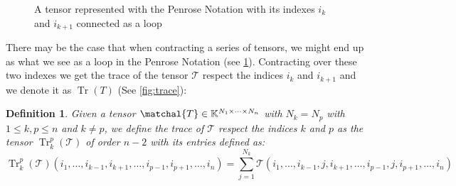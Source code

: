 \documentclass[11pt,a4paper,openright,oneside]{book}
\numberwithin{equation}{section}
\newtheorem{defn0}{Definition}[chapter]
\newenvironment{definition}{ \begin{defn0}}{\end{defn0}}
\newcommand{\figref}[1]{\cref{#1}}
\DeclareMathOperator{\Tr}{Tr}
\begin{document}
\begin{figure}
\centering
{}
\caption{
    A tensor represented with the Penrose Notation with its indexes $i_k$ and $i_{k+1}$ connected as a loop
}
\label{fig:loop}
\end{figure}

There may be the case that when contracting a series of tensors, we might end up as what
we see as a loop in the Penrose Notation (see \figref{fig:loop}). Contracting over these two indexes we get the trace
of the tensor $\mathcal{T}$ respect the indices $i_k$ and $i_{k+1}$ and we denote it as $\Tr(T)$ (See \figref{fig:trace}):

\begin{definition}
    Given a tensor $\matchal{T} \in \mathbb{K}^{N_1 \times \cdots \times N_n}$ with $N_k = N_p$ with $1 \leqslant k, p \leqslant n$ and $k \neq p$,
    we define the trace of $\mathcal{T}$ respect the indices $k$ and $p$ as the tensor $\Tr_k^p(\mathcal{T})$ of order $n - 2$ with its entries defined as:
    $$\Tr_k^p(\mathcal{T}) (i_1, \dots, i_{k-1}, i_{k+1}, \dots, i_{p-1}, i_{p+1}, \dots, i_n) = \sum_{j = 1}^{N_k} \mathcal{T}(i_1, \dots, i_{k-1}, j, i_{k+1}, \dots, i_{p-1}, j, i_{p+1}, \dots, i_n)$$

\end{definition}
\end{document}

